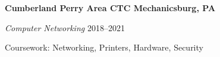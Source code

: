 \textbf{Cumberland Perry Area CTC \hfill Mechanicsburg, PA} \par
\textit{Computer Networking} \hfill 2018--2021\par
Coursework: Networking, Printers, Hardware, Security \par

